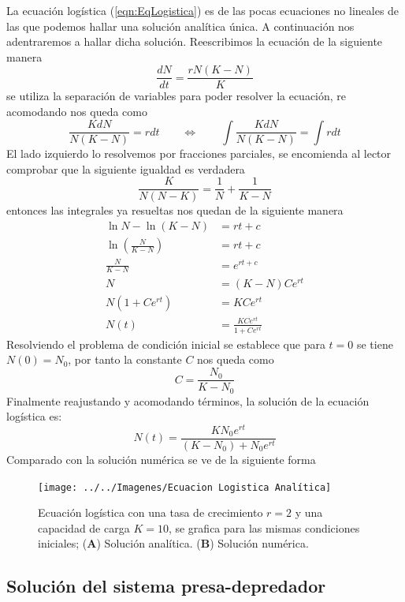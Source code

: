 La ecuación logística (\ref{eqn:EqLogistica}) es de las pocas ecuaciones no lineales de las que podemos hallar una solución analítica única. A continuación nos adentraremos a hallar dicha solución. Reescribimos la ecuación de la siguiente manera
$$\frac{dN}{dt}=\frac{rN(K-N)}{K}$$
se utiliza la separación de variables para poder resolver la ecuación, re acomodando nos queda como
$$\frac{KdN}{N(K-N)}=rdt\qquad\Longleftrightarrow\qquad \int\frac{KdN}{N(K-N)}=\int rdt$$
El lado izquierdo lo resolvemos por fracciones parciales, se encomienda al lector comprobar que la siguiente igualdad es verdadera
$$\frac{K}{N(N-K)}=\frac{1}{N}+\frac{1}{K-N}$$
entonces las integrales ya resueltas nos quedan de la siguiente manera
\begin{align*}
	\ln N-\ln(K-N)&=rt+c \\
	\ln\left (\frac{N}{K-N}\right ) &= rt+c\\
	\frac{N}{K-N}&=e^{rt+c}\\
	N&=(K-N)Ce^{rt}\\
	N(1+Ce^{rt})&=KCe^{rt}\\
	N(t)&=\frac{KCe^{rt}}{1+Ce^{rt}}
\end{align*}
Resolviendo el problema de condición inicial se establece que para $t=0$ se tiene $N(0)=N_0$, por tanto la constante $C$ nos queda como
$$C=\frac{N_0}{K-N_0}$$
Finalmente reajustando y acomodando términos, la solución de la ecuación logística es:
\begin{equation}\label{eqn:SolEqLogistica}
	N(t)=\frac{KN_0e^{rt}}{(K-N_0)+N_0e^{rt}}
\end{equation}
Comparado con la solución numérica se ve de la siguiente forma
\begin{figure}[h!]
	\centering
	\texttt{[image: ../../Imagenes/Ecuacion Logistica Analítica]}
	\caption{Ecuación logística con una tasa de crecimiento $r=2$ y una capacidad de carga $K=10$, se grafica para las mismas condiciones iniciales; (\textbf{A}) Solución analítica. (\textbf{B}) Solución numérica.}
	\label{fig:EcuacionLogisticaAnalitica}
\end{figure}
\newpage
\subsection{Solución del sistema presa-depredador}\label{sec:SolPresaDepredador}

